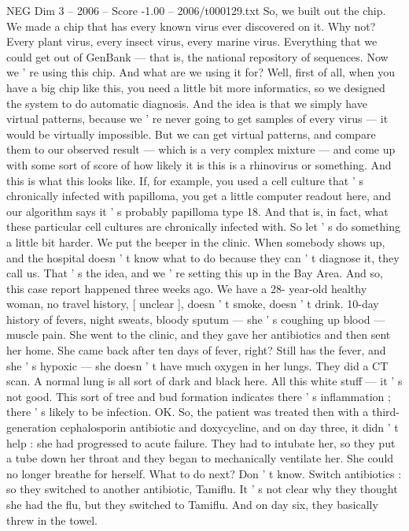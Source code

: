 \begin{textsample}{NEG Dim 3 – 2006 – Score -1.00 – 2006/t000129.txt}
So, we built out the chip.
We made a chip that has every known virus ever discovered on it.
Why not?
Every plant virus, every insect virus, every marine virus.
Everything that we could get out of GenBank — that is, the national repository of sequences.
Now we ' re using this chip.
And what are we using it for?
Well, first of all, when you have a big chip like this, you need a little bit more informatics, so we designed the system to do automatic diagnosis.
And the idea is that we simply have virtual patterns, because we ' re never going to get samples of every virus — it would be virtually impossible.
But we can get virtual patterns, and compare them to our observed result — which is a very complex mixture — and come up with some sort of score of how likely it is this is a rhinovirus or something.
And this is what this looks like.
If, for example, you used a cell culture that ' s chronically infected with papilloma, you get a little computer readout here, and our algorithm says it ' s probably papilloma type 18.
And that is, in fact, what these particular cell cultures are chronically infected with.
So let ' s do something a little bit harder.
We put the beeper in the clinic.
When somebody shows up, and the hospital doesn ' t know what to do because they can ' t diagnose it, they call us.
That ' s the idea, and we ' re setting this up in the Bay Area.
And so, this case report happened three weeks ago.
We have a 28- year-old healthy woman, no travel history, [ unclear ], doesn ' t smoke, doesn ' t drink. 10-day history of fevers, night sweats, bloody sputum — she ' s coughing up blood — muscle pain.
She went to the clinic, and they gave her antibiotics and then sent her home.
She came back after ten days of fever, right?
Still has the fever, and she ' s hypoxic — she doesn ' t have much oxygen in her lungs.
They did a CT scan.
A normal lung is all sort of dark and black here.
All this white stuff — it ' s not good.
This sort of tree and bud formation indicates there ' s inflammation ; there ' s likely to be infection.
OK.
So, the patient was treated then with a third-generation cephalosporin antibiotic and doxycycline, and on day three, it didn ' t help : she had progressed to acute failure.
They had to intubate her, so they put a tube down her throat and they began to mechanically ventilate her.
She could no longer breathe for herself.
What to do next?
Don ' t know.
Switch antibiotics : so they switched to another antibiotic, Tamiflu.
It ' s not clear why they thought she had the flu, but they switched to Tamiflu.
And on day six, they basically threw in the towel.

\end{textsample}
